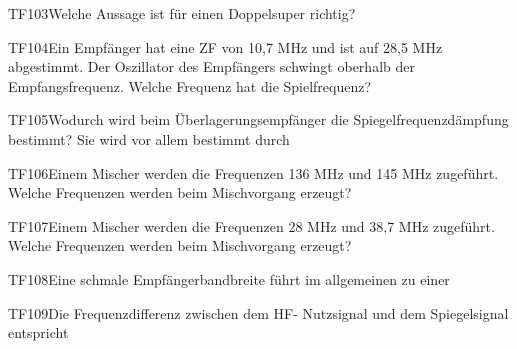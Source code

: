 \begin{question}{TF103}{Welche Aussage ist für einen Doppelsuper richtig?}
\end{question}

\begin{question}{TF104}{Ein Empfänger hat eine ZF von 10,7 MHz und ist auf 28,5 MHz abgestimmt. Der Oszillator des Empfängers schwingt oberhalb der Empfangsfrequenz. Welche Frequenz hat die Spielfrequenz?}
\end{question}

\begin{question}{TF105}{Wodurch wird beim Überlagerungsempfänger die Spiegelfrequenzdämpfung bestimmt? Sie wird vor allem bestimmt durch}
\end{question}

\begin{question}{TF106}{Einem Mischer werden die Frequenzen 136 MHz und 145 MHz zugeführt. Welche Frequenzen werden beim Mischvorgang erzeugt?}
\end{question}

\begin{question}{TF107}{Einem Mischer werden die Frequenzen 28 MHz und 38,7 MHz zugeführt. Welche Frequenzen werden beim Mischvorgang erzeugt?}
\end{question}

\begin{question}{TF108}{Eine schmale Empfängerbandbreite führt im allgemeinen zu einer}
\end{question}

\begin{question}{TF109}{Die Frequenzdifferenz zwischen dem HF- Nutzsignal und dem Spiegelsignal entspricht}
\end{question}

